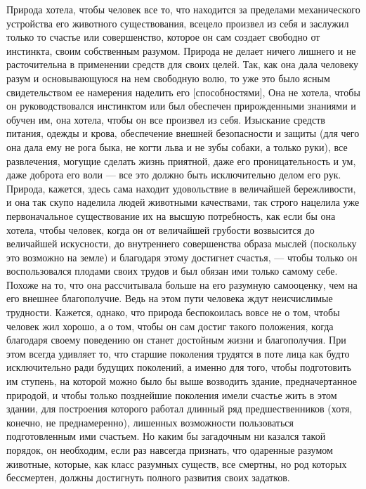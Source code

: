 \documentclass[a4paper]{book}
\begin{document}
Природа хотела, чтобы человек все то, что находится за пределами механического устройства его животного существования, всецело произвел из себя и заслужил только то счастье или совершенство, которое он сам создает свободно от инстинкта, своим собственным разумом. Природа не делает ничего лишнего и не расточительна в применении средств для своих целей. Так, как она дала человеку разум и основывающуюся на нем свободную волю, то уже это было ясным свидетельством ее намерения наделить его [способностями], Она не хотела, чтобы он руководствовался инстинктом или был обеспечен прирожденными знаниями и обучен им, она хотела, чтобы он все произвел из себя. Изыскание средств питания, одежды и крова, обеспечение внешней безопасности и защиты (для чего она дала ему не рога быка, не когти льва и не зубы собаки, а только руки), все развлечения, могущие сделать жизнь приятной, даже его проницательность и ум, даже доброта его воли — все это должно быть исключительно делом его рук. Природа, кажется, здесь сама находит удовольствие в величайшей бережливости, и она так скупо наделила людей животными качествами, так строго нацелила уже первоначальное существование их на высшую потребность, как если бы она хотела, чтобы человек, когда он от величайшей грубости возвысится до величайшей искусности, до внутреннего совершенства образа мыслей (поскольку это возможно на земле) и благодаря этому достигнет счастья, — чтобы только он воспользовался плодами своих трудов и был обязан ими только самому себе. Похоже на то, что она рассчитывала больше на его разумную самооценку, чем на его внешнее благополучие. Ведь на этом пути человека ждут неисчислимые трудности. Кажется, однако, что природа беспокоилась вовсе не о том, чтобы человек жил хорошо, а о том, чтобы он сам достиг такого положения, когда благодаря своему поведению он станет достойным жизни и благополучия. При этом всегда удивляет то, что старшие поколения трудятся в поте лица как будто исключительно ради будущих поколений, а именно для того, чтобы подготовить им ступень, на которой можно было бы выше возводить здание, предначертанное природой, и чтобы только позднейшие поколения имели счастье жить в этом здании, для построения которого работал длинный ряд предшественников (хотя, конечно, не преднамеренно), лишенных возможности пользоваться подготовленным ими счастьем. Но каким бы загадочным ни казался такой порядок, он необходим, если раз навсегда признать, что одаренные разумом животные, которые, как класс разумных существ, все смертны, но род которых бессмертен, должны достигнуть полного развития своих задатков.
\end{document}

